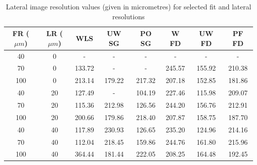 \begin{table}[t!]
	\begin{center}
		\begin{tabular}{|c||c||c|c|c|c|c|c|}
			\hline 
			FR ($\mu m$) & LR ($\mu m$) & WLS & UW SG & PO SG & W FD & UW FD & PF FD \\
			\hline
			\hline
			40 & 0 & - & - & - & - & - & - \\
			\hline
			70 & 0 & 133.72 & - & - & 245.57 & 155.92 & 210.38 \\
			\hline
			100 & 0 & 213.14 & 179.22 & 217.32 & 207.18 & 152.85 & 181.86 \\
			\hline
			40 & 20 & 127.49 & - & 104.19 & 227.46 & 115.98 & 209.07 \\
			\hline
			70 & 20 & 115.36 & 212.98 & 126.56 & 244.20 & 156.76 &  212.91 \\
			\hline
			100 & 20 & 200.66 & 179.86 & 218.40 & 207.87 & 158.75 & 187.70 \\
			\hline
			40 & 40 & 117.89 &  230.93 & 126.65 & 235.20 & 124.96 & 214.16 \\
			\hline
			70 & 40 & 112.04 & 218.45 & 159.86 & 244.76 & 161.80 & 215.96 \\
			\hline
			100 & 40 & 364.44 & 181.44 & 222.05 & 208.25 & 164.48 & 192.45 \\
			\hline
		\end{tabular}
	\end{center}
	\caption{Lateral image resolution values (given in micrometres) for selected fit and lateral resolutions}
	\label{lateral_imageres_table}
\end{table}

